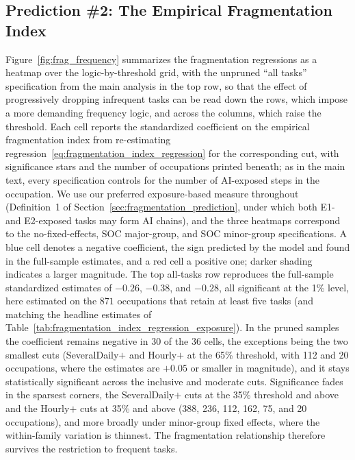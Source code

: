 \subsection{Prediction \#2: The Empirical Fragmentation Index}
\label{app:frequency_robustness_frag}

Figure~\ref{fig:frag_frequency} summarizes the fragmentation regressions as a heatmap over the logic-by-threshold grid, with the unpruned ``all tasks'' specification from the main analysis in the top row, so that the effect of progressively dropping infrequent tasks can be read down the rows, which impose a more demanding frequency logic, and across the columns, which raise the threshold.
Each cell reports the standardized coefficient on the empirical fragmentation index from re-estimating regression~\eqref{eq:fragmentation_index_regression} for the corresponding cut, with significance stars and the number of occupations printed beneath; as in the main text, every specification controls for the number of AI-exposed steps in the occupation.
We use our preferred exposure-based measure throughout (Definition~1 of Section~\ref{sec:fragmentation_prediction}, under which both E1- and E2-exposed tasks may form AI chains), and the three heatmaps correspond to the no-fixed-effects, SOC major-group, and SOC minor-group specifications.
A blue cell denotes a negative coefficient, the sign predicted by the model and found in the full-sample estimates, and a red cell a positive one; darker shading indicates a larger magnitude.
The top all-tasks row reproduces the full-sample standardized estimates of $-0.26$, $-0.38$, and $-0.28$, all significant at the 1\% level, here estimated on the $871$ occupations that retain at least five tasks (and matching the headline estimates of Table~\ref{tab:fragmentation_index_regression_exposure}).
In the pruned samples the coefficient remains negative in 30 of the 36 cells, the exceptions being the two smallest cuts (SeveralDaily$+$ and Hourly$+$ at the 65\% threshold, with 112 and 20 occupations, where the estimates are $+0.05$ or smaller in magnitude), and it stays statistically significant across the inclusive and moderate cuts.
Significance fades in the sparsest corners, the SeveralDaily$+$ cuts at the 35\% threshold and above and the Hourly$+$ cuts at 35\% and above (388, 236, 112, 162, 75, and 20 occupations), and more broadly under minor-group fixed effects, where the within-family variation is thinnest.
The fragmentation relationship therefore survives the restriction to frequent tasks.

